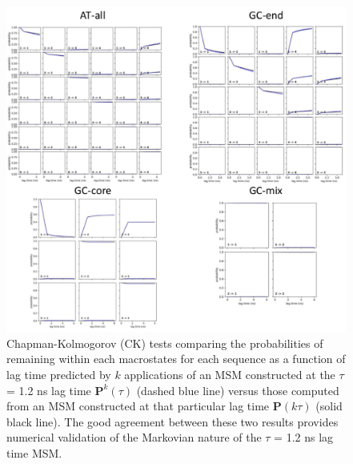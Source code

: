 \documentclass[journal=jpcbfk,manuscript=article]{achemso}
\begin{document}
\begin{figure}[ht!]
	\begin{center}
        \includegraphics[width=1.0\textwidth]{FigS3.pdf}
        \caption{Chapman-Kolmogorov (CK) tests comparing the probabilities of remaining within each macrostates for each sequence as a function of lag time predicted by $k$ applications of an MSM constructed at the $\tau$ = 1.2 ns lag time $\mathbf{P}^k(\tau)$ (dashed blue line) versus those computed from an MSM constructed at that particular lag time $\mathbf{P}(k \tau)$ (solid black line). The good agreement between these two results provides numerical validation of the Markovian nature of the $\tau$ = 1.2 ns lag time MSM.}
        \label{fig:SIFig3}
	\end{center}
\end{figure}

\clearpage
\newpage
\end{document}
